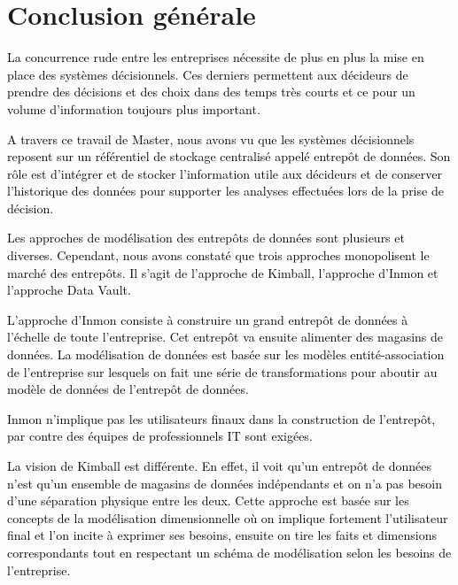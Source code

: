 \documentclass[a4paper,12pt]{report}
\begin{document}
\newpage
\chapter*{Conclusion générale}


\textcolor{black}{La concurrence rude entre les entreprises nécessite de plus en plus la mise en place des systèmes décisionnels. Ces derniers permettent aux décideurs de prendre des décisions et des choix dans des temps très courts et ce pour un volume d’information toujours plus important. }


\textcolor{black}{A travers ce travail de Master, nous avons vu que les systèmes décisionnels reposent sur un référentiel de stockage centralisé appelé entrepôt de données. Son rôle est d'intégrer et de stocker l'information utile aux décideurs et de conserver l'historique des données pour supporter les analyses effectuées lors de la prise de décision. }


\textcolor{black}{Les approches de modélisation des entrepôts de données sont plusieurs et diverses. Cependant, nous avons constaté que trois approches monopolisent le marché des entrepôts. Il s’agit de l’approche de Kimball, l’approche d’Inmon et l’approche Data Vault. }


\textcolor{black}{L’approche d’Inmon consiste à construire un grand entrepôt de données à l’échelle de toute l’entreprise. Cet entrepôt va ensuite alimenter des magasins de données. La modélisation de données est basée sur les modèles entité-association de l’entreprise sur lesquels on fait une série de transformations pour aboutir au modèle de données de l’entrepôt de données. }



\textcolor{black}{  Inmon n’implique pas les utilisateurs finaux dans la construction de l’entrepôt, par contre des équipes de professionnels IT sont exigées. }

\textcolor{black}{
La vision de Kimball est différente. En effet, il voit qu’un entrepôt de données n’est qu’un ensemble de magasins de données indépendants et on n’a pas besoin d’une séparation physique entre les deux. Cette approche est basée sur les concepts de la modélisation dimensionnelle où on implique fortement l’utilisateur final et l’on incite à exprimer ses besoins, ensuite on tire les faits et dimensions correspondants tout en respectant un schéma de modélisation selon les besoins de l’entreprise.}
\end{document}
